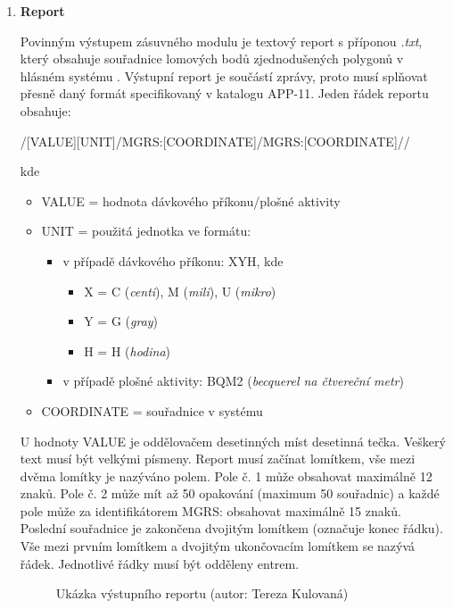 \begin{enumerate}
	\item \textbf{Report}

Povinným výstupem zásuvného modulu je textový report s příponou \textit{.txt}, který obsahuje souřadnice lomových bodů zjednodušených polygonů v hlásném systému . Výstupní report je součástí  zprávy, proto musí splňovat přesně daný formát specifikovaný v katalogu APP-11. Jeden řádek reportu obsahuje:

/[VALUE][UNIT]/MGRS:[COORDINATE]/MGRS:[COORDINATE]//

kde
\begin{itemize}
			\item VALUE = hodnota dávkového příkonu/plošné aktivity 
			
			\item UNIT = použitá jednotka ve formátu:
			
			\begin{itemize}
				\item v případě dávkového příkonu: XYH, kde
			 		\begin{itemize}
						\item X = C (\textit{centi}), M (\textit{mili}), U (\textit{mikro})
						\item Y = G (\textit{gray})
						\item H = H (\textit{hodina})
					\end{itemize}
				\item v případě plošné aktivity: BQM2 (\textit{becquerel na čtvereční metr})
			\end{itemize}
			
			\item COORDINATE = souřadnice v systému 
\end{itemize}
				
U hodnoty VALUE je oddělovačem desetinných míst desetinná tečka. Veškerý text musí být velkými písmeny. Report musí začínat lomítkem, vše mezi dvěma lomítky je nazýváno polem. Pole č. 1 může obsahovat maximálně 12 znaků. Pole č. 2 může mít až 50 opakování (maximum 50 souřadnic) a každé pole může za identifikátorem MGRS: obsahovat maximálně 15 znaků. Poslední souřadnice je zakončena dvojitým lomítkem (označuje konec řádku). Vše mezi prvním lomítkem a dvojitým ukončovacím lomítkem se nazývá řádek. Jednotlivé řádky musí být odděleny entrem.	

\begin{figure}[H]
    \centering
      \caption[Výstupní report]{Ukázka výstupního reportu (autor: Tereza Kulovaná)}
      \label{fig:report}
\end{figure}


\end{enumerate}
